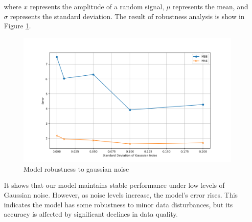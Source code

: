 \documentclass[12pt]{article}%
\begin{document}
where $x$ represents the amplitude of a random signal, $\mu$ represents the mean, and $\sigma$ represents the standard deviation. 
\clearpage
The result of robustness analysis is show in Figure \ref{mg2}.
\begin{figure}[H]
	\centering
	\includegraphics[scale=0.63]{figure//mg2.png}
	\caption{Model robustness to gaussian noise}
	\label{mg2}
\end{figure}
It shows that our model maintains stable performance under low levels of Gaussian noise. However, as noise levels increase, the model's error rises. This indicates the model has some robustness to minor data disturbances, but its accuracy is affected by significant declines in data quality.











	
\end{document}
